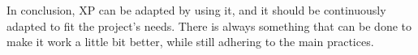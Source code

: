 In conclusion, XP can be adapted by using it, and it should be continuously adapted to fit the project's needs. There is always something that can be done to make it work a little bit better, while still adhering to the main practices.




